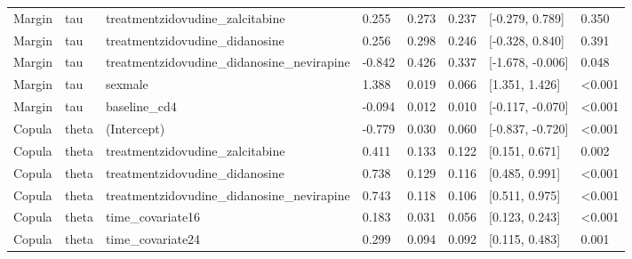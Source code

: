 \begin{table}
\begin{tabular}[t]{llllllll}
Margin & tau & treatmentzidovudine\_zalcitabine & 0.255 & 0.273 & 0.237 & {}[-0.279, 0.789] & 0.350\\
Margin & tau & treatmentzidovudine\_didanosine & 0.256 & 0.298 & 0.246 & {}[-0.328, 0.840] & 0.391\\
Margin & tau & treatmentzidovudine\_didanosine\_nevirapine & -0.842 & 0.426 & 0.337 & {}[-1.678, -0.006] & 0.048\\
Margin & tau & sexmale & 1.388 & 0.019 & 0.066 & {}[1.351, 1.426] & <0.001\\
\addlinespace
Margin & tau & baseline\_cd4 & -0.094 & 0.012 & 0.010 & {}[-0.117, -0.070] & <0.001\\
Copula & theta & (Intercept) & -0.779 & 0.030 & 0.060 & {}[-0.837, -0.720] & <0.001\\
Copula & theta & treatmentzidovudine\_zalcitabine & 0.411 & 0.133 & 0.122 & {}[0.151, 0.671] & 0.002\\
Copula & theta & treatmentzidovudine\_didanosine & 0.738 & 0.129 & 0.116 & {}[0.485, 0.991] & <0.001\\
Copula & theta & treatmentzidovudine\_didanosine\_nevirapine & 0.743 & 0.118 & 0.106 & {}[0.511, 0.975] & <0.001\\
\addlinespace
Copula & theta & time\_covariate16 & 0.183 & 0.031 & 0.056 & {}[0.123, 0.243] & <0.001\\
Copula & theta & time\_covariate24 & 0.299 & 0.094 & 0.092 & {}[0.115, 0.483] & 0.001\\
\bottomrule
\end{tabular}
\end{table}
